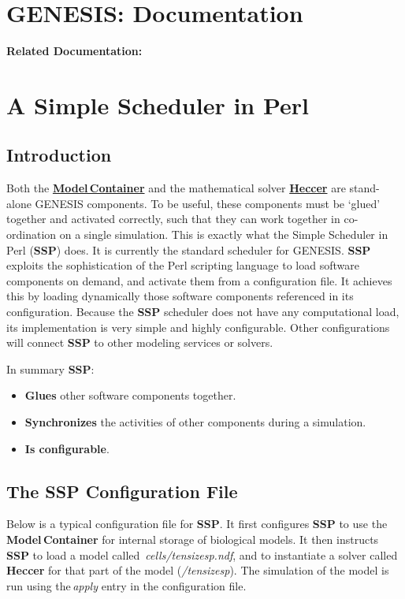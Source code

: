 \documentclass[12pt]{article}
\begin{document}
\section*{GENESIS: Documentation}

{\bf Related Documentation:}

\section*{A Simple Scheduler in Perl}

\subsection*{Introduction}

Both the \href{../model-container/model-container.tex}{\bf Model\,Container} and the mathematical solver \href{../heccer/heccer.tex}{\bf Heccer} are stand-alone GENESIS components. To be useful, these components must be `glued' together and activated correctly, such that they can work together in co-ordination on a single simulation. This is exactly what the Simple Scheduler in Perl ({\bf SSP}) does. It is currently the standard scheduler for GENESIS. {\bf SSP} exploits the sophistication of the Perl scripting language to load software components on demand, and activate them from a configuration file. It achieves this by loading dynamically those software components referenced in its configuration. Because the {\bf SSP} scheduler does not have any computational load, its implementation is very simple and highly configurable. Other configurations will connect {\bf SSP} to other modeling services or solvers.

In summary {\bf SSP}:

\begin{itemize}
\item {\bf Glues} other software components together.
\item {\bf Synchronizes} the activities of other components during a simulation.
\item {\bf Is configurable}. 
\end{itemize}

\subsection*{The SSP Configuration File}

Below is a typical configuration file for {\bf SSP}. It first configures {\bf SSP} to use the\,{\bf Model\,Container} for internal storage of biological models. It then instructs {\bf SSP} to load a model called \,{\it cells/tensizesp.ndf}, and to instantiate a solver called\,{\bf Heccer} for that part of the model ({\it /tensizesp}). The simulation of the model is run using the\,{\it apply} entry in the configuration file.
\end{document}
